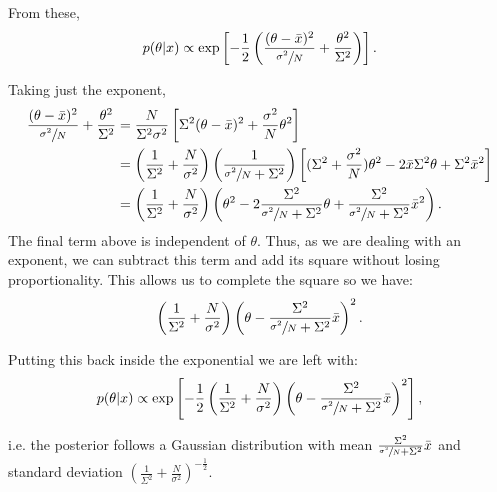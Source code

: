 \documentclass[a4paper,11pt,twoside]{article}
\begin{document}
From these,
\begin{equation*}
	p(\theta|x) \propto \exp \left[ -\frac{1}{2} \left( \frac{(\theta - \bar{x})^2}{\sfrac{\sigma^2}{N}} +\frac{\theta^2}{\Sigma^2} \right) \right].
\end{equation*}

Taking just the exponent,
\begin{align*}
	\frac{(\theta - \bar{x})^2}{\sfrac{\sigma^2}{N}} + \frac{\theta^2}{\Sigma^2} &= \frac{N}{\Sigma^2\sigma^2} \left[\Sigma^2 (\theta - \bar{x})^2 + \frac{\sigma^2}{N} \theta^2 \right]
	\\ &= \left( \frac{1}{\Sigma^2} + \frac{N}{\sigma^2} \right) \left( \frac{1}{\sfrac{\sigma^2}{N} + \Sigma^2} \right) \left[ (\Sigma^2 + \frac{\sigma^2}{N})\theta^2 - 2\bar{x}\Sigma^2\theta + \Sigma^2\bar{x}^2 \right]
	\\ &= \left( \frac{1}{\Sigma^2} + \frac{N}{\sigma^2} \right) \left( \theta^2 - 2 \frac{\Sigma^2}{\sfrac{\sigma^2}{N} + \Sigma^2} \theta + \frac{\Sigma^2}{\sfrac{\sigma^2}{N} + \Sigma^2} \bar{x}^2 \right).
\end{align*}
The final term above is independent of $\theta$. Thus, as we are dealing with an exponent, we can subtract this term and add its square without losing proportionality. This allows us to complete the square so we have:
\begin{equation*}
	\left( \frac{1}{\Sigma^2} + \frac{N}{\sigma^2} \right) \left( \theta - \frac{\Sigma^2}{\sfrac{\sigma^2}{N} + \Sigma^2} \bar{x} \right)^2.
\end{equation*}

Putting this back inside the exponential we are left with:
\begin{equation*}
	p(\theta|x) \propto \exp \left[ -\frac{1}{2} \left( \frac{1}{\Sigma^2} + \frac{N}{\sigma^2} \right) \left( \theta - \frac{\Sigma^2}{\sfrac{\sigma^2}{N} + \Sigma^2} \bar{x} \right)^2 \right],
\end{equation*}

i.e. the posterior follows a Gaussian distribution with mean $\frac{\Sigma^2}{\sfrac{\sigma^2}{N} + \Sigma^2} \bar{x}$ and standard deviation $\left( \frac{1}{\Sigma^2} + \frac{N}{\sigma^2} \right)^{-\frac{1}{2}}$.
\end{document}
